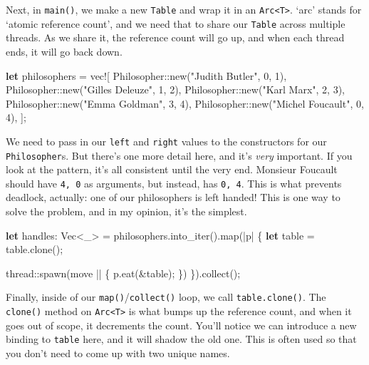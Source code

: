 \documentclass[a4paper,]{book}
\newenvironment{Shaded}{\begin{snugshade}}{\end{snugshade}}
\newcommand{\KeywordTok}[1]{\textcolor[rgb]{0.13,0.29,0.53}{\textbf{{#1}}}}
\newcommand{\DecValTok}[1]{\textcolor[rgb]{0.00,0.00,0.81}{{#1}}}
\newcommand{\StringTok}[1]{\textcolor[rgb]{0.31,0.60,0.02}{{#1}}}
\newcommand{\OtherTok}[1]{\textcolor[rgb]{0.56,0.35,0.01}{{#1}}}
\newcommand{\NormalTok}[1]{{#1}}
\begin{document}
Next, in \texttt{main()}, we make a new \texttt{Table} and wrap it in an
\texttt{Arc\textless{}T\textgreater{}}. `arc' stands for `atomic
reference count', and we need that to share our \texttt{Table} across
multiple threads. As we share it, the reference count will go up, and
when each thread ends, it will go back down.

\begin{Shaded}
\begin{Highlighting}[]
\KeywordTok{let} \NormalTok{philosophers = }\OtherTok{vec!}\NormalTok{[}
    \NormalTok{Philosopher::new(}\StringTok{"Judith Butler"}\NormalTok{, }\DecValTok{0}\NormalTok{, }\DecValTok{1}\NormalTok{),}
    \NormalTok{Philosopher::new(}\StringTok{"Gilles Deleuze"}\NormalTok{, }\DecValTok{1}\NormalTok{, }\DecValTok{2}\NormalTok{),}
    \NormalTok{Philosopher::new(}\StringTok{"Karl Marx"}\NormalTok{, }\DecValTok{2}\NormalTok{, }\DecValTok{3}\NormalTok{),}
    \NormalTok{Philosopher::new(}\StringTok{"Emma Goldman"}\NormalTok{, }\DecValTok{3}\NormalTok{, }\DecValTok{4}\NormalTok{),}
    \NormalTok{Philosopher::new(}\StringTok{"Michel Foucault"}\NormalTok{, }\DecValTok{0}\NormalTok{, }\DecValTok{4}\NormalTok{),}
\NormalTok{];}
\end{Highlighting}
\end{Shaded}

We need to pass in our \texttt{left} and \texttt{right} values to the
constructors for our \texttt{Philosopher}s. But there's one more detail
here, and it's \emph{very} important. If you look at the pattern, it's
all consistent until the very end. Monsieur Foucault should have
\texttt{4,\ 0} as arguments, but instead, has \texttt{0,\ 4}. This is
what prevents deadlock, actually: one of our philosophers is left
handed! This is one way to solve the problem, and in my opinion, it's
the simplest.

\begin{Shaded}
\begin{Highlighting}[]
\KeywordTok{let} \NormalTok{handles: Vec<_> = philosophers.into_iter().map(|p| \{}
    \KeywordTok{let} \NormalTok{table = table.clone();}

    \NormalTok{thread::spawn(move || \{}
        \NormalTok{p.eat(&table);}
    \NormalTok{\})}
\NormalTok{\}).collect();}
\end{Highlighting}
\end{Shaded}

Finally, inside of our \texttt{map()}/\texttt{collect()} loop, we call
\texttt{table.clone()}. The \texttt{clone()} method on
\texttt{Arc\textless{}T\textgreater{}} is what bumps up the reference
count, and when it goes out of scope, it decrements the count. You'll
notice we can introduce a new binding to \texttt{table} here, and it
will shadow the old one. This is often used so that you don't need to
come up with two unique names.
\end{document}

